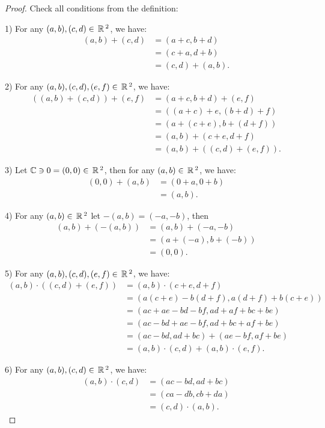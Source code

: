 \begin{proof}
Check all conditions from the definition:

1) For any $(a, b),(c, d) \in \,\mathbb{R}\,^2$, we have:
$$
\begin{aligned}
(a, b)+(c, d) & =(a+c, b+d) \\
& =(c+a, d+b) \\
& =(c, d)+(a, b) .
\end{aligned}
$$

2) For any $(a, b),(c, d),(e, f) \in \,\mathbb{R}\,^2$, we have:
$$
\begin{aligned}
((a, b)+(c, d))+(e, f) & =(a+c, b+d)+(e, f) \\
& =((a+c)+e,(b+d)+f) \\
& =(a+(c+e), b+(d+f)) \\
& =(a, b)+(c+e, d+f) \\
& =(a, b)+((c, d)+(e, f)) .
\end{aligned}
$$

3) Let $\mathbb{C} \ni 0 = (0,0) \in \,\mathbb{R}\,^2$, then for any $(a, b) \in \,\mathbb{R}\,^2$, we have:
$$
\begin{aligned}
(0,0)+(a, b) & =(0+a, 0+b) \\
& =(a, b) .
\end{aligned}
$$

4) For any $(a, b) \in \,\mathbb{R}\,^2$ let $-(a, b) = (-a,-b)$, then
$$
\begin{aligned}
(a, b)+(-(a, b)) & =(a, b)+(-a,-b) \\
& =(a+(-a), b+(-b)) \\
& =(0,0) .
\end{aligned}
$$

5) For any $(a, b),(c, d),(e, f) \in \,\mathbb{R}\,^2$, we have:
$$
\begin{aligned}
(a, b) \cdot((c, d)+(e, f)) & =(a, b) \cdot(c+e, d+f) \\
& =(a(c+e)-b(d+f), a(d+f)+b(c+e)) \\
& =(a c+a e-b d-b f, a d+a f+b c+b e) \\
& =(a c-b d+a e-b f, a d+b c+a f+b e) \\
& =(a c-b d, a d+b c)+(a e-b f, a f+b e) \\
& =(a, b) \cdot(c, d)+(a, b) \cdot(e, f) .
\end{aligned}
$$

6) For any $(a, b),(c, d) \in \,\mathbb{R}\,^2$, we have:
$$
\begin{aligned}
(a, b) \cdot(c, d) & =(a c-b d, a d+b c) \\
& =(c a-d b, c b+d a) \\
& =(c, d) \cdot(a, b) .
\end{aligned}
$$


\end{proof}
